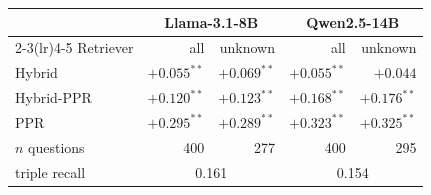 \begin{tabular}{lrrrr}
\toprule
 & \multicolumn{2}{c}{Llama-3.1-8B} & \multicolumn{2}{c}{Qwen2.5-14B}\\
\cmidrule(lr){2-3}\cmidrule(lr){4-5}
Retriever & all & unknown & all & unknown\\
\midrule
Hybrid & $+0.055^{**}$ & $+0.069^{**}$ & $+0.055^{**}$ & $+0.044$\\
Hybrid-PPR & $+0.120^{**}$ & $+0.123^{**}$ & $+0.168^{**}$ & $+0.176^{**}$\\
PPR & $+0.295^{**}$ & $+0.289^{**}$ & $+0.323^{**}$ & $+0.325^{**}$\\
\midrule
$n$ questions & 400 & 277 & 400 & 295\\
triple recall & \multicolumn{2}{c}{0.161} & \multicolumn{2}{c}{0.154}\\
\bottomrule
\end{tabular}
